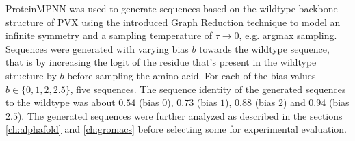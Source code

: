 ProteinMPNN was used to generate sequences based on the wildtype backbone structure of PVX using the introduced Graph Reduction technique to model an infinite symmetry and a sampling temperature of $\tau\rightarrow 0$, e.g. argmax sampling. Sequences were generated with varying bias $b$ towards the wildtype sequence, that is by increasing the logit of the residue that's present in the wildtype structure by $b$ before sampling the amino acid. For each of the bias values $b \in \{0, 1, 2, 2.5\}$, five sequences. The sequence identity of the generated sequences to the wildtype was about $0.54$ (bias $0$), $0.73$ (bias $1$), $0.88$ (bias $2$) and $0.94$ (bias $2.5$). The generated sequences were further analyzed as described in the sections \ref{ch:alphafold} and \ref{ch:gromacs} before selecting some for experimental evaluation. 